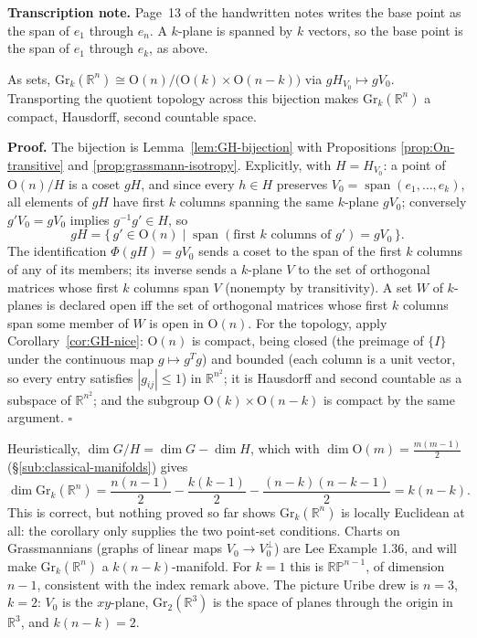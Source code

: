 \documentclass[11pt]{report}
\makeatletter
\newcounter{thmcounter}[section]
\renewenvironment{proof}[1][Proof]{\noindent\textbf{#1.} }{\hfill$\square$\par\vspace{5pt}}
\newcommand{\thmlabel}[1]{\edef\@currentlabel{\arabic{section}.\arabic{thmcounter}}\label{#1}}
\newcommand{\Ogp}{\mathrm{O}}
\newcommand{\Gr}{\mathrm{Gr}}
\DeclareMathOperator{\Span}{span}
\newcommand{\leeref}[1]{\par\smallskip{\raggedleft\footnotesize\textsc{Lee}:\ #1\par}}
\makeatother
\begin{document}
\textbf{Transcription note.} Page~13 of the handwritten notes writes the base point as the span of $e_1$ through $e_n$. A $k$-plane is spanned by $k$ vectors, so the base point is the span of $e_1$ through $e_k$, as above.

\begin{corbox}\thmlabel{cor:grassmannian}
As sets, $\Gr_k(\mathbb{R}^n) \cong \Ogp(n)/\big(\Ogp(k) \times \Ogp(n-k)\big)$ via $g H_{V_0} \mapsto g V_0$. Transporting the quotient topology across this bijection makes $\Gr_k(\mathbb{R}^n)$ a compact, Hausdorff, second countable space.
\leeref{Examples 1.36 and 21.21}
\end{corbox}

\begin{proof}
The bijection is Lemma~\ref{lem:GH-bijection} with Propositions \ref{prop:On-transitive} and \ref{prop:grassmann-isotropy}. Explicitly, with $H = H_{V_0}$: a point of $\Ogp(n)/H$ is a coset $gH$, and since every $h \in H$ preserves $V_0 = \Span(e_1, \ldots, e_k)$, all elements of $gH$ have first $k$ columns spanning the same $k$-plane $gV_0$; conversely $g' V_0 = g V_0$ implies $g^{-1}g' \in H$, so
\[
gH = \{\, g' \in \Ogp(n) \mid \Span(\text{first } k \text{ columns of } g') = g V_0 \,\}.
\]
The identification $\Phi(gH) = gV_0$ sends a coset to the span of the first $k$ columns of any of its members; its inverse sends a $k$-plane $V$ to the set of orthogonal matrices whose first $k$ columns span $V$ (nonempty by transitivity). A set $W$ of $k$-planes is declared open iff the set of orthogonal matrices whose first $k$ columns span some member of $W$ is open in $\Ogp(n)$. For the topology, apply Corollary~\ref{cor:GH-nice}: $\Ogp(n)$ is compact, being closed (the preimage of $\{I\}$ under the continuous map $g \mapsto g^T g$) and bounded (each column is a unit vector, so every entry satisfies $|g_{ij}| \le 1$) in $\mathbb{R}^{n^2}$; it is Hausdorff and second countable as a subspace of $\mathbb{R}^{n^2}$; and the subgroup $\Ogp(k) \times \Ogp(n-k)$ is compact by the same argument.
\end{proof}

\begin{rembox}\label{rem:dimension-count-what-still-missing}
Heuristically, $\dim G/H = \dim G - \dim H$, which with $\dim \Ogp(m) = \tfrac{m(m-1)}{2}$ (\S\ref{sub:classical-manifolds}) gives
\[
\dim \Gr_k(\mathbb{R}^n) = \frac{n(n-1)}{2} - \frac{k(k-1)}{2} - \frac{(n-k)(n-k-1)}{2} = k(n-k).
\]
This is correct, but nothing proved so far shows $\Gr_k(\mathbb{R}^n)$ is locally Euclidean at all: the corollary only supplies the two point-set conditions. Charts on Grassmannians (graphs of linear maps $V_0 \to V_0^\perp$) are Lee Example 1.36, and will make $\Gr_k(\mathbb{R}^n)$ a $k(n-k)$-manifold. For $k = 1$ this is $\mathbb{RP}^{n-1}$, of dimension $n - 1$, consistent with the index remark above. The picture Uribe drew is $n = 3$, $k = 2$: $V_0$ is the $xy$-plane, $\Gr_2(\mathbb{R}^3)$ is the space of planes through the origin in $\mathbb{R}^3$, and $k(n-k) = 2$.
\end{rembox}
\end{document}
